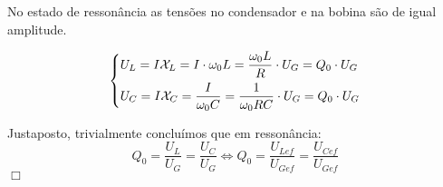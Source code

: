 No estado de ressonância as tensões no condensador e na bobina são de igual amplitude.

$$
\begin{dcases*}
U_L = I \mathcal{X}_L = I\cdot \omega_0 L = \frac{\omega_0 L}{R}\cdot U_G = Q_0\cdot U_G\\
U_C = I \mathcal{X}_C = \frac{I}{\omega_0 C} = \frac{1}{\omega_0 RC}\cdot U_G = Q_0\cdot U_G
\end{dcases*}
$$

Justaposto, trivialmente concluímos que em ressonância: 
$$ 
Q_0 = \dfrac{U_L}{U_G} = \dfrac{U_C}{U_G} \iff Q_0 = \dfrac{U_{Lef}}{U_{Gef}} = \dfrac{U_{Cef}}{U_{Gef}}
$$
\hfill \ensuremath{\Box}
